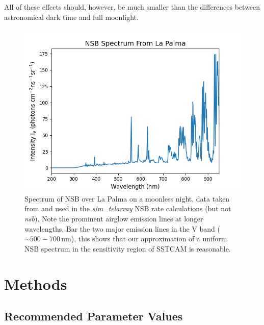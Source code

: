 All of these effects should, however, be much smaller than the differences between astronomical dark time and full moonlight.
\begin{figure}[t!]
\begin{centering}
\includegraphics[width=\columnwidth]{./figures/bandeplot.png}
\caption{Spectrum of NSB over La Palma on a moonless night, data taken from \cite{BandE} and used in the \textit{sim\_telarray} NSB rate calculations (but not \textit{nsb}). Note the prominent airglow emission lines at longer wavelengths. Bar the two major emission lines in the V band ($\mathrm{\sim500-700\,nm}$), this shows that our approximation of a uniform NSB spectrum in the sensitivity region of SSTCAM is reasonable.}
\label{fig:BandE}
\end{centering}
\end{figure}

\section{Methods}


\subsection{Recommended Parameter Values}
\label{sec:examples:params}

